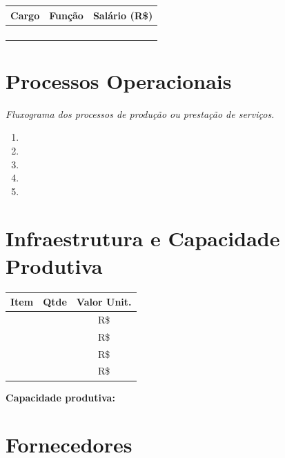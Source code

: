 \documentclass[
	12pt,
	openright,
	oneside,
	a4paper,
	chapter=TITLE,
	section=TITLE,
	english,
	brazil
	]{abntex2}
\newcommand{\icampo}{%
	\hrulefill
}
\newcommand{\tcampo}[1]{%
	{#1}%
}
\newcommand{\instrucao}[1]{%
	\vspace{0.3cm}%
	\noindent%
	{%
		\setlength{\fboxsep}{6pt}%
		\colorbox{azul-claro}{%
			\begin{minipage}{\dimexpr\textwidth-2\fboxsep\relax}%
				\setlength{\parindent}{1.25cm}%
				{\color{cinza-instrucao}\small\itshape #1}%
			\end{minipage}%
		}%
	}%
	\vspace{0.3cm}%
}
\begin{document}
\centering
\begin{tabularx}{\textwidth}{X X c}
\toprule
\rowcolor{azul-claro}
\textbf{Cargo} & \textbf{Função} & \textbf{Salário (R\$)} \\
\midrule
\tcampo{} & \tcampo{} & \tcampo{} \\
\tcampo{} & \tcampo{} & \tcampo{} \\
\tcampo{} & \tcampo{} & \tcampo{} \\
\tcampo{} & \tcampo{} & \tcampo{} \\
\bottomrule
\end{tabularx}

\section{Processos Operacionais}

\instrucao{Fluxograma dos processos de produção ou prestação de serviços.}

\begin{enumerate}[itemsep=0.3cm]
	\item \icampo
	\item \icampo
	\item \icampo
	\item \icampo
	\item \icampo
\end{enumerate}

\section{Infraestrutura e Capacidade Produtiva}

\centering
\begin{tabularx}{\textwidth}{X c c}
\toprule
\rowcolor{azul-claro}
\textbf{Item} & \textbf{Qtde} & \textbf{Valor Unit.} \\
\midrule
\tcampo{} & \tcampo{} & R\$ \tcampo{} \\
\tcampo{} & \tcampo{} & R\$ \tcampo{} \\
\tcampo{} & \tcampo{} & R\$ \tcampo{} \\
\tcampo{} & \tcampo{} & R\$ \tcampo{} \\
\bottomrule
\end{tabularx}

\vspace{0.3cm}
\textbf{Capacidade produtiva:} \icampo

\section{Fornecedores}
\end{document}

